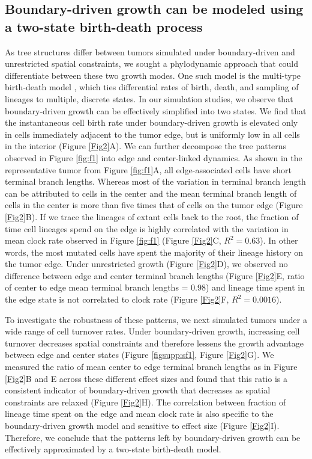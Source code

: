 \documentclass[12pt]{elife_based}
\begin{document}
\subsection*{Boundary-driven growth can be modeled using a two-state birth-death process}
As tree structures differ between tumors simulated under boundary-driven and unrestricted spatial constraints, we sought a phylodynamic approach that could differentiate between these two growth modes. One such model is the multi-type birth-death model \citep{Maddison2007a,stadler2013uncovering,Kuhnert:2016vv}, which ties differential rates of birth, death, and sampling of lineages to multiple, discrete states. In our simulation studies, we observe that boundary-driven growth can be effectively simplified into two states. We find that the instantaneous cell birth rate under boundary-driven growth is elevated only in cells immediately adjacent to the tumor edge, but is uniformly low in all cells in the interior (Figure \ref{Fig2}A). We can further decompose the tree patterns observed in Figure \ref{fig:f1} into edge and center-linked dynamics. As shown in the representative tumor from Figure \ref{fig:f1}A, all edge-associated cells have short terminal branch lengths. Whereas most of the variation in terminal branch length can be attributed to cells in the center and the mean terminal branch length of cells in the center is more than five times that of cells on the tumor edge (Figure \ref{Fig2}B). If we trace the lineages of extant cells back to the root, the fraction of time cell lineages spend on the edge is highly correlated with the variation in mean clock rate observed in Figure \ref{fig:f1} (Figure \ref{Fig2}C, $R^2 = 0.63$). In other words, the most mutated cells have spent the majority of their lineage history on the tumor edge. Under unrestricted growth (Figure \ref{Fig2}D), we observed no difference between edge and center terminal branch lengths (Figure \ref{Fig2}E, ratio of center to edge mean terminal branch lengths = 0.98) and lineage time spent in the edge state is not correlated to clock rate (Figure \ref{Fig2}F, $R^2 = 0.0016$).

To investigate the robustness of these patterns, we next simulated tumors under a wide range of cell turnover rates. Under boundary-driven growth, increasing cell turnover decreases spatial constraints and therefore lessens the growth advantage between edge and center states (Figure \ref{figsupp:sf1}, Figure \ref{Fig2}G). We measured the ratio of mean center to edge terminal branch lengths as in Figure \ref{Fig2}B and E across these different effect sizes and found that this ratio is a consistent indicator of boundary-driven growth that decreases as spatial constraints are relaxed (Figure \ref{Fig2}H). The correlation between fraction of lineage time spent on the edge and mean clock rate is also specific to the boundary-driven growth model and sensitive to effect size (Figure \ref{Fig2}I). Therefore, we conclude that the patterns left by boundary-driven growth can be effectively approximated by a two-state birth-death model.
\end{document}
